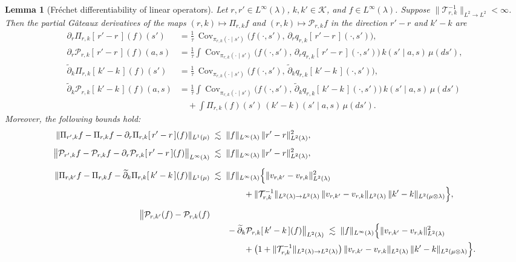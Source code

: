 \documentclass[11pt]{article}
\newcommand{\adk}{\widetilde{\partial}_k}
\theoremstyle{plain}
\newtheorem{lemma}[theorem]{Lemma}
\begin{document}
\begin{lemma}[Fréchet differentiability of linear operators]
\label{lemma::operatorderivatives}
Let $r, r' \in L^\infty(\lambda)$, $k, k' \in \mathcal{K}$, and $f \in L^\infty(\lambda)$.  
Suppose $\|\mathcal{T}_{r,k}^{-1}\|_{L^2 \rightarrow L^2} < \infty$.
Then the partial Gâteaux derivatives of the maps $(r,k) \mapsto \Pi_{r, k} f$ and $(r,k) \mapsto \mathcal{P}_{r, k} f$ in the direction $r'-r$ and $k' - k$ are
\begin{align*}
\partial_r \Pi_{r, k}[\,r'-r\,](f)(s') 
&= \frac{1}{\tau}\,\operatorname{Cov}_{\pi_{r, k}(\cdot \mid s')}
   \big(f(\cdot, s'),\, \partial_r q_{r,k}[\,r'-r\,](\cdot, s')\big), \\[0.8ex]
%
\partial_r \mathcal{P}_{r,k}[\,r'-r\,](f)(a,s)    
&= \frac{1}{\tau}\int \operatorname{Cov}_{\pi_{r, k}(\cdot\mid s')}\!\Big(
       f(\cdot,s'),\, \partial_r q_{r,k}[\,r'-r\,](\cdot,s')
     \Big)\,k(s'\mid a,s)\,\mu(ds'), \\[1.2ex]
%
\adk \Pi_{r, k}[\,k'-k\,](f)(s') 
&= \frac{1}{\tau}\,\operatorname{Cov}_{\pi_{r, k}(\cdot \mid s')}
   \big(f(\cdot, s'),\, \adk q_{r,k}[\,k'-k\,](\cdot, s')\big), \\[0.8ex]
%
\adk \mathcal{P}_{r,k}[\,k'-k\,](f)(a,s) 
&= \frac{1}{\tau}\int \operatorname{Cov}_{\pi_{r, k}(\cdot\mid s')}\!\Big(
       f(\cdot,s'),\, \adk q_{r,k}[\,k'-k\,](\cdot,s')
     \Big)\,k(s'\mid a,s)\,\mu(ds') \\
&\quad + \int \Pi_{r,k}(f)(s')\,(k'-k)(s' \mid a, s)\,\mu(ds').
\end{align*}
Moreover, the following bounds hold:
\begin{align*}
\|\Pi_{r', k} f - \Pi_{r, k} f 
   - \partial_r \Pi_{r, k}[\,r'-r\,](f)\|_{L^1(\mu)}
&\;\lesssim\; \|f\|_{L^\infty(\lambda)} \, \|r'-r\|_{L^2(\lambda)}^2, \\[1.0ex]
%
\big\| \mathcal{P}_{r', k} f - \mathcal{P}_{r, k} f 
      - \partial_r \mathcal{P}_{r, k}[\,r'-r\,](f) \big\|_{L^\infty(\lambda)}    
&\;\lesssim\; \|f\|_{L^\infty(\lambda)} \, \|r'-r\|_{L^2(\lambda)}^2, \\[1.2ex]
%
\|\Pi_{r, k'} f - \Pi_{r, k} f 
   - \adk \Pi_{r, k}[\,k'-k\,](f)\|_{L^1(\mu)} 
&\;\lesssim\; \|f\|_{L^\infty(\lambda)} \Big\{
      \|v_{r, k'} - v_{r,k}\|_{L^2(\lambda)}^2 \notag\\
&\qquad\qquad
      + \|\mathcal{T}_{r,k}^{-1}\|_{L^2(\lambda) \to L^2(\lambda)} \,
        \|v_{r,k'} - v_{r,k}\|_{L^2(\lambda)}\,
        \|k' - k\|_{L^2(\mu \otimes \lambda)}
      \Big\}, \\[1.2ex]
%
\big\|\mathcal{P}_{r,k'}(f) - \mathcal{P}_{r,k}(f)\notag\\
&\qquad - \adk \mathcal{P}_{r,k}[\,k'-k\,](f)\big\|_{L^2(\lambda)} 
\;\lesssim\; \|f\|_{L^\infty(\lambda)} \Big\{
      \|v_{r, k'} - v_{r,k}\|_{L^2(\lambda)}^2 \notag\\
&\qquad\qquad
      + \big(1 + \|\mathcal{T}_{r,k}^{-1}\|_{L^2(\lambda) \to L^2(\lambda)}\big)\,
        \|v_{r,k'} - v_{r,k}\|_{L^2(\lambda)}\,
        \|k' - k\|_{L^2(\mu \otimes \lambda)}
      \Big\}.
\end{align*}
\end{lemma}
\end{document}
